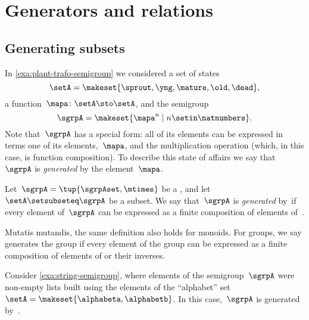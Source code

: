 
\section{Generators and relations}


\subsection{Generating subsets}

In \cref{exa:plant-trafo-semigroup} we considered a set of states
%
\begin{equation}
    \setA= \makeset{ \sprout, \yng, \mature, \old, \dead },
\end{equation}
%
a function~$\mapa \colon \setA \sto \setA$, and the semigroup
%
\begin{equation}
    \label{eq:trafo-sgrp-one-gen}
    \sgrpA = \makeset{ \mapa^n \mid n \setin \natnumbers }.
\end{equation}
%
Note that~$\sgrpA$ has a special form: all of its elements can be expressed in terms one of its elements,~$\mapa$, and the multiplication operation (which, in this case, is function composition).
To describe this state of affairs we say that~$\sgrpA$ is \emph{generated} by the element~$\mapa$.

\begin{ctdefinition}
    \label{def:gen-semigrp}
    Let~$\sgrpA = \tup{\sgrpAset, \mtimes}$ be a  , and let~$\setA \setsubseteq \sgrpA$ be a subset.
    We say that~$\sgrpA$ is \emph{generated} by~\setA if every element of~$\sgrpA$ can be expressed as a finite composition of elements of~\setA.
\end{ctdefinition}

\begin{remark}
    Mutatis mutandis, the same definition also holds for monoids.
    For groups, we say \setA generates the group if every element of the group can be expressed as a finite composition of elements of \setA or their inverses.
\end{remark}

\begin{example}
    Consider \cref{exa:string-semigroup}, where elements of the semigroup~$\sgrpA$ were non-empty lists built using the elements of the ``alphabet'' set~$\setA = \makeset{ \alphabeta, \alphabetb}$.
    In this case,~$\sgrpA$ is generated by~\setA.
\end{example}

